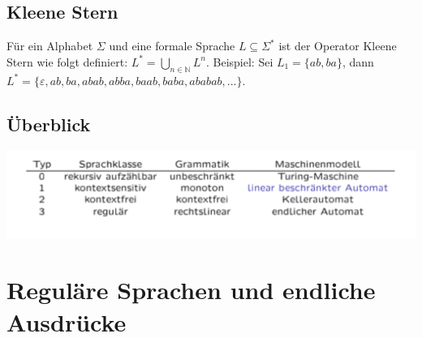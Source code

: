 \documentclass[12pt,a4paper]{article}
\begin{document}
	\subsection{Kleene Stern}
	Für ein Alphabet $\varSigma$ und eine formale Sprache $L \subseteq \varSigma^*$ ist der Operator Kleene Stern wie folgt definiert: $L^* = \underset{n \in \mathbb{N}}{\bigcup} L^n$.\newline \newline
	Beispiel: Sei $L_1 = \{ ab, ba\}$, dann $L^* = \{\varepsilon, ab, ba, abab, abba, baab, baba, ababab, ...\}$.

	\subsection{Überblick}
	\includegraphics[width=\textwidth]{Bilder/Zusammenhang_Sprache_Grammatik_Maschinenmodell.png}
	
\section{Reguläre Sprachen und endliche Ausdrücke}
\end{document}
